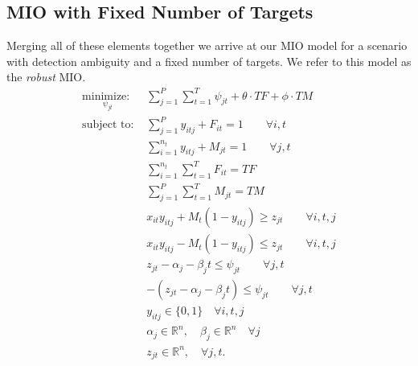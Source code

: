 \subsection{MIO with Fixed Number of Targets}
Merging all of these elements together we arrive at our MIO model for a scenario with detection ambiguity and a fixed number of targets. We refer to this model as the \textit{robust} MIO. 
\begin{align}
\underset{\psi_{jt}}{\text{minimize: }} & \sum_{j=1}^{P} \sum_{t=1}^{T} \psi_{jt} + \theta \cdot TF + \phi \cdot TM \label{eq:simple_robust}\\
\text{subject to: }	& \sum_{j=1}^{P} y_{itj} + F_{it} = 1 \qquad \forall i,t \nonumber \\
				& \sum_{i=1}^{n_{t}} y_{itj} + M_{jt} = 1 \qquad \forall j,t \nonumber\\
				& \sum_{i=1}^{n_{t}} \sum_{t=1}^{T} F_{it} = TF \nonumber \\
				& \sum_{j=1}^{P} \sum_{t=1}^{T} M_{jt} = TM \nonumber \\
				& x_{it}y_{itj} + M_{t}(1-y_{itj}) \geq z_{jt} \qquad \forall i,t,j \nonumber \\
				& x_{it}y_{itj} - M_{t}(1-y_{itj}) \leq z_{jt} \qquad \forall i,t,j \nonumber \\
				& z_{jt} - \alpha_{j} - \beta_{j}t \leq \psi_{jt} \qquad \forall j,t \nonumber \\
				& -(z_{jt} - \alpha_{j} - \beta_{j}t) \leq \psi_{jt} \qquad \forall j,t \nonumber \\
				& y_{itj} \in \{0,1\} \quad \forall i,t,j \nonumber \\
				& \alpha_{j} \in \mathbb{R}^n,\quad \beta_{j} \in \mathbb{R}^n \quad \forall j \nonumber\\
				& z_{jt} \in \mathbb{R}^n, \quad \forall j,t. \nonumber
\end{align}


